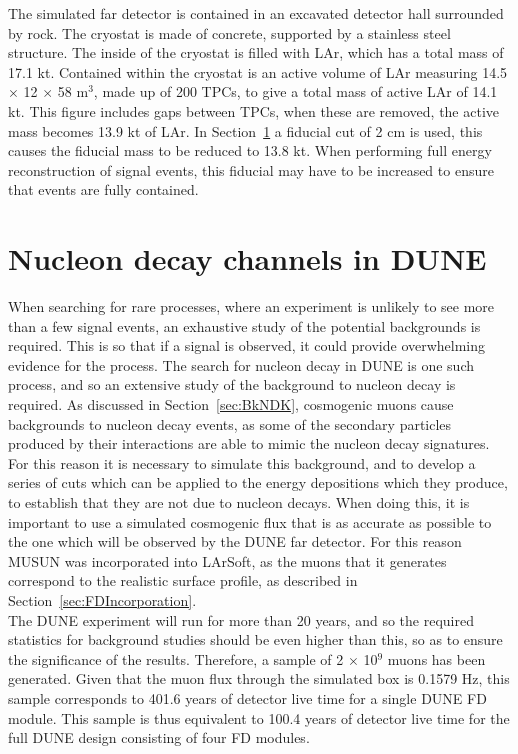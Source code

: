 The simulated far detector is contained in an excavated detector hall surrounded by rock. The cryostat is made of concrete, supported by a stainless steel structure. The inside of the cryostat is filled with LAr, which has a total mass of 17.1 kt. Contained within the cryostat is an active volume of LAr measuring 14.5 $\times$ 12 $\times$ 58 m$^{3}$, made up of 200 TPCs, to give a total mass of active LAr of 14.1 kt. This figure includes gaps between TPCs, when these are removed, the active mass becomes 13.9 kt of LAr. In Section~\ref{sec:DUNENDK} a fiducial cut of 2 cm is used, this causes the fiducial mass to be reduced to 13.8 kt. When performing full energy reconstruction of signal events, this fiducial may have to be increased to ensure that events are fully contained. \\

\section{Nucleon decay channels in DUNE} \label{sec:DUNENDK} %
When searching for rare processes, where an experiment is unlikely to see more than a few signal events, an exhaustive study of the potential backgrounds is required. This is so that if a signal is observed, it could provide overwhelming evidence for the process. The search for nucleon decay in DUNE is one such process, and so an extensive study of the background to nucleon decay is required. As discussed in Section~\ref{sec:BkNDK}, cosmogenic muons cause backgrounds to nucleon decay events, as some of the secondary particles produced by their interactions are able to mimic the nucleon decay signatures. For this reason it is necessary to simulate this background, and to develop a series of cuts which can be applied to the energy depositions which they produce, to establish that they are not due to nucleon decays. When doing this, it is important to use a simulated cosmogenic flux that is as accurate as possible to the one which will be observed by the DUNE far detector. For this reason MUSUN was incorporated into LArSoft, as the muons that it generates correspond to the realistic surface profile, as described in Section~\ref{sec:FDIncorporation}. \\

The DUNE experiment will run for more than 20 years, and so the required statistics for background studies should be even higher than this, so as to ensure the significance of the results. Therefore, a sample of 2 $\times$ 10$^{9}$ muons has been generated. Given that the muon flux through the simulated box is 0.1579 Hz, this sample corresponds to 401.6 years of detector live time for a single DUNE FD module. This sample is thus equivalent to 100.4 years of detector live time for the full DUNE design consisting of four FD modules. \\


